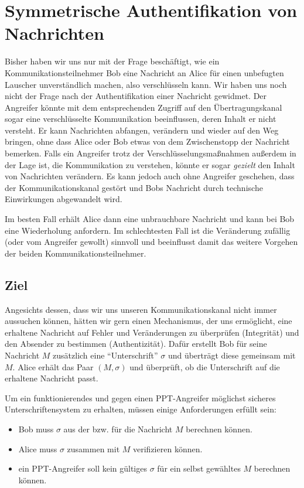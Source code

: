 \chapter{Symmetrische Authentifikation von
  Nachrichten}\indexMessageAuthSymm
\label{cha:symauth}

Bisher haben wir uns nur mit der Frage beschäftigt, wie ein
Kommunikationsteilnehmer Bob eine Nachricht an Alice für einen
unbefugten Lauscher unverständlich machen, also verschlüsseln kann. Wir
haben uns noch nicht der Frage nach der Authentifikation einer Nachricht
gewidmet.  Der Angreifer könnte mit dem entsprechenden Zugriff auf den
Übertragungskanal sogar eine verschlüsselte Kommunikation beeinflussen,
deren Inhalt er nicht versteht. Er kann Nachrichten abfangen, verändern
und wieder auf den Weg bringen, ohne dass Alice oder Bob etwas von dem
Zwischenstopp der Nachricht bemerken.  Falls ein Angreifer trotz der
Verschlüsselungsmaßnahmen außerdem in der Lage ist, die Kommunikation zu
verstehen, könnte er sogar \textit{gezielt} den Inhalt von Nachrichten
verändern.  Es kann jedoch auch ohne Angreifer geschehen, dass der
Kommunikationskanal gestört und Bobs Nachricht durch technische
Einwirkungen abgewandelt wird.

Im besten Fall erhält Alice dann eine unbrauchbare Nachricht und kann
bei Bob eine Wiederholung anfordern. Im schlechtesten Fall ist die
Veränderung zufällig (oder vom Angreifer gewollt) sinnvoll und
beeinflusst damit das weitere Vorgehen der beiden
Kommunikationsteilnehmer.

\section{Ziel} Angesichts dessen, dass wir uns unseren
Kommunikationskanal nicht immer aussuchen können, hätten wir gern einen
Mechanismus, der uns ermöglicht, eine erhaltene Nachricht auf Fehler und
Veränderungen zu überprüfen (Integrität) und den Absender zu bestimmen
(Authentizität). Dafür erstellt Bob für seine Nachricht $M$ zusätzlich
eine "`Unterschrift"' $\sigma$ \indexSig und überträgt diese gemeinsam
mit $M$. Alice erhält das Paar $(M,\sigma)$ und überprüft, ob die
Unterschrift auf die erhaltene Nachricht passt.

Um ein funktionierendes und gegen einen PPT-Angreifer möglichst sicheres
Unterschriftensystem zu erhalten, müssen einige Anforderungen erfüllt
sein:
\begin{itemize}
\item Bob muss $\sigma$ aus der bzw. für die Nachricht $M$ berechnen
  können.
\item Alice muss $\sigma$ zusammen mit $M$ verifizieren können.
\item ein PPT-Angreifer soll kein gültiges $\sigma$ für ein selbst
  gewähltes $M$ berechnen können.
\end{itemize}


